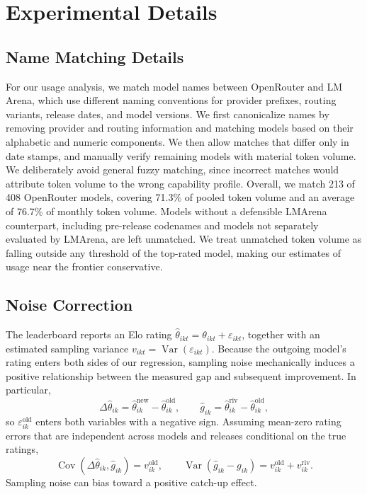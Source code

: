 \section{Experimental Details}
\label{app:experimental_details}

\subsection{Name Matching Details}
\label{app:matching_details}

For our usage analysis, we match model names between OpenRouter and LM Arena, which use different naming conventions for provider prefixes, routing variants, release dates, and model versions. 
We first canonicalize names by removing provider and routing information and matching models based on their alphabetic and numeric components.
We then allow matches that differ only in date stamps, and manually verify remaining models with material token volume. 
We deliberately avoid general fuzzy matching, since incorrect matches would attribute token volume to the wrong capability profile. 
Overall, we match 213 of 408 OpenRouter models, covering 71.3\% of pooled token volume and an average of 76.7\% of monthly token volume.
Models without a defensible LMArena counterpart, including pre-release codenames and models not separately evaluated by LMArena, are left unmatched. 
We treat unmatched token volume as falling outside any threshold of the top-rated model, making our estimates of usage near the frontier conservative.

\subsection{Noise Correction}
\label{app:noise_correction}
The leaderboard reports an Elo rating \(\hat\theta_{ikt}=\theta_{ikt}+\varepsilon_{ikt}\), together with an estimated sampling variance \(v_{ikt}=\operatorname{Var}(\varepsilon_{ikt})\).
Because the outgoing model's rating enters both sides of our regression, sampling noise mechanically induces a positive relationship between the measured gap and subsequent improvement. 
In particular,
\[
\Delta\hat\theta_{ik} = \hat\theta^{\mathrm{new}}_{ik} - \hat\theta^{\mathrm{old}}_{ik}, \qquad \hat g_{ik} = \hat\theta^{\mathrm{riv}}_{ik} - \hat\theta^{\mathrm{old}}_{ik},
\]
so \(\varepsilon^{\mathrm{old}}_{ik}\) enters both variables with a negative sign. 
Assuming mean-zero rating errors that are independent across models and releases conditional on the true ratings,
\[
\operatorname{Cov} \left( \Delta\hat\theta_{ik},\hat g_{ik} \right) = v^{\mathrm{old}}_{ik}, \qquad \operatorname{Var} \left( \hat g_{ik}-g_{ik} \right) = v^{\mathrm{old}}_{ik}+v^{\mathrm{riv}}_{ik}.
\]
Sampling noise can bias toward a positive catch-up effect. 

